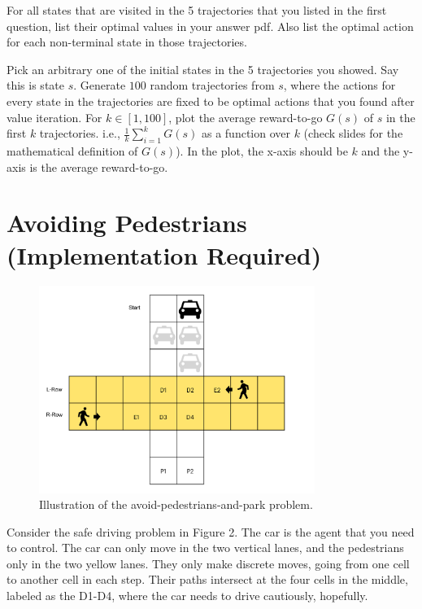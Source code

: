\documentclass{article}
\begin{document}
\begin{question}[1 Point]
For all states that are visited in the 5 trajectories that you listed in the first question, list their optimal values in your answer pdf. Also list the optimal action for each non-terminal state in those trajectories. 
\end{question}

\begin{question}[2 Points]
Pick an arbitrary one of the initial states in the 5 trajectories you showed. Say this is state $s$. Generate $100$ random trajectories from $s$, where the actions for every state in the trajectories are fixed to be optimal actions that you found after value iteration. For $k\in [1,100]$, plot the average reward-to-go $G(s)$ of $s$ in the first $k$ trajectories. i.e., $\frac{1}{k}\sum_{i=1}^k G(s)$ as a function over $k$ (check slides for the mathematical definition of $G(s)$). In the plot, the x-axis should be $k$ and the y-axis is the average reward-to-go. 
\end{question}



\section{Avoiding Pedestrians (Implementation Required)}

\begin{figure}[h!]
    \centering
    \includegraphics[width=0.8\textwidth]{rl.pdf}
    \caption{Illustration of the avoid-pedestrians-and-park problem.}
    \label{fig:my_label}
\end{figure}

Consider the safe driving problem in Figure 2. The car is the agent that you need to control. The car can only move in the two vertical lanes, and the pedestrians only in the two yellow lanes. They only make discrete moves, going from one cell to another cell in each step. Their paths intersect at the four cells in the middle, labeled as the D1-D4, where the car needs to drive cautiously, hopefully. 
\end{document}
